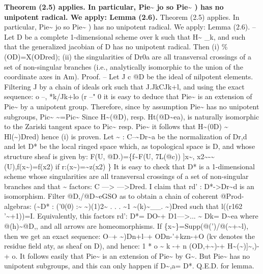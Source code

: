 \documentclass[11pt]{article}
\theoremstyle{plain}
\theoremstyle{definition}
\theoremstyle{remark}
\begin{document}
\noindent\textbf{Theorem (2.5) applies. In particular, Pie\textasciitilde{} jo so Pie\textasciitilde{} ) has no unipotent radical. We apply: Lemma (2.6).} Theorem (2.5) applies. In particular, Pie\textasciitilde{} jo so Pie\textasciitilde{} ) has no unipotent radical. We apply: Lemma (2.6). -- Let D be a complete 1-dimensional scheme over k such that H\textasciitilde{} \_k, and such that the generalized jacobian of D has no unipotent radical. Then (i) \%(OD)=X(ODred); (ii) the singularities of Dr0a are all transversal crossings of a set of non-singular branches (i.e., analytically isomorphic to the union of the coordinate axes in Am). Proof. -- Let J c @D be the ideal of nilpotent elements. Filtering J by a chain of ideals ork such that J.JkCJk+l, and using the exact sequence: o --, *k/Jk+lo (r --" 0 it is easy to deduce that Pie\textasciitilde{} is an extension of Pie\textasciitilde{} by a unipotent group. Therefore, since by assumption Pie\textasciitilde{} has no unipotent subgroups, Pic\textasciitilde{} \textasciitilde{}=Pic\textasciitilde{} Since H\textasciitilde{}(@D), resp. Ht(@D\textasciitilde{}ea), is naturally isomorphic to the Zariski tangent space to Pic\textasciitilde{} resp. Pie\textasciitilde{} it follows that H\textasciitilde{}(0D) \textasciitilde{} Hl(\textasciitilde{})Dred) hence (i) is proven. Let \textasciitilde{} : C--\textasciitilde{}Dr\textasciitilde{}a be the normalization of Dr,d and let D* be the local ringed space which, as topological space is D, and whose structure sheaf is given by: F(U, @D.)=\{f\textasciitilde{}F(U, 7L(@c)) ]x\textasciitilde{}, x2\textasciitilde{}-\textasciitilde{}(U),f(x\textasciitilde{})=f(x2) if r:(x\textasciitilde{})=\textasciitilde{}z(x2) \} It is easy to check that D* is a 1-dimensional scheme whose singularities are all transversal crossings of a set of non-singular branches and that \textasciitilde{} factors: C ---> --->Dred. I claim that rd' : D*->Dr\textasciitilde{}d is an isomorphism. Filter @D,/@D\textasciitilde{}eGSO as to obtain a chain of coherent @Prod-algebras: (\textasciitilde{}D* : ('0(0) :\textasciitilde{} \textasciitilde{})(1)2\textasciitilde{} . . . \textasciitilde{}1 \textasciitilde{}(k)\textasciitilde{}\_\_. \textasciitilde{})Dred such that l((r162 '\textasciitilde{}+1))=I. Equivalently, this factors rd': D*= DO-+ D1--->... \textasciitilde{} Dk= D\textasciitilde{}ea where @(h)\textasciitilde{}@D,, and all arrows are homeomorphisms. If \{x\textasciitilde{}\}=Supp(@(')/@(\textasciitilde{}+\textasciitilde{}l), then we get an exact sequence: O--+ \textasciitilde{})Dn+l--+ ODn-'+kzn-+O (kv denotes the residue field aty, as sheaf on D), and hence: 1 * o \textasciitilde{} k -+ n (OD,+\textasciitilde{})-+ H\textasciitilde{}(\textasciitilde{})]\textasciitilde{},)-+ o. It follows easily that Pie\textasciitilde{} is an extension of Pie\textasciitilde{} by G\textasciitilde{}. But Pie\textasciitilde{} has no unipotent subgroups, and this can only happen if D\textasciitilde{},a= D*. Q.E.D. for lemma.
\end{document}
